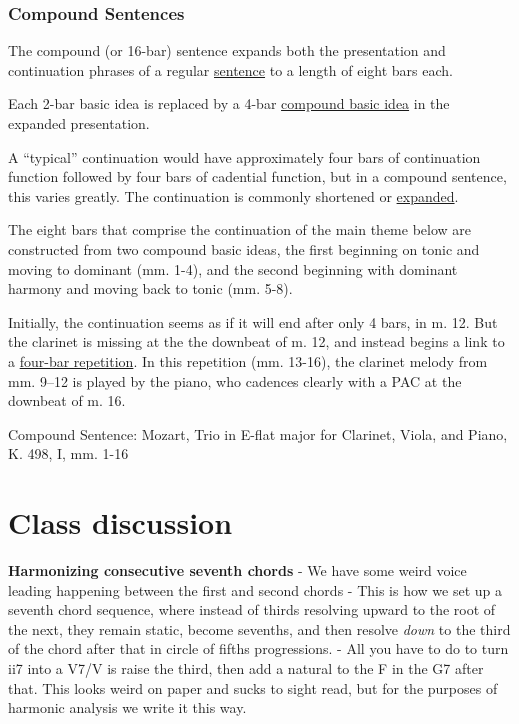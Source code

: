\documentclass{book}
\begin{document}
\hypertarget{compound-sentences}{%
\subsection{Compound Sentences}\label{compound-sentences}}

The compound (or 16-bar) sentence expands both the presentation and
continuation phrases of a regular \href{sentence.html}{sentence} to a length
of eight bars each.

Each 2-bar basic idea is replaced by a 4-bar
\href{hybridThemes.html\#the-compound-basic-idea}{compound basic idea} in the
expanded presentation.

A ``typical'' continuation would have approximately four bars of continuation
function followed by four bars of cadential function, but in a compound
sentence, this varies greatly. The continuation is commonly shortened or
\href{internalExpansions.html}{expanded}.

The eight bars that comprise the continuation of the main theme below are
constructed from two compound basic ideas, the first beginning on tonic and
moving to dominant (mm. 1-4), and the second beginning with dominant harmony
and moving back to tonic (mm. 5-8).

Initially, the continuation seems as if it will end after only 4 bars, in m.
12. But the clarinet is missing at the the downbeat of m. 12, and instead
begins a link to a \href{internalExpansions.html\#phrase-expansion}{four-bar
repetition}. In this repetition (mm. 13-16), the clarinet melody from mm.
9--12 is played by the piano, who cadences clearly with a PAC at the downbeat
of m. 16.

Compound Sentence: Mozart, Trio in E-flat major for Clarinet, Viola, and
Piano, K. 498, I, mm. 1-16

\hypertarget{class-discussion-54}{%
\chapter{Class discussion}\label{class-discussion-54}}

\textbf{Harmonizing consecutive seventh chords} - We have some weird voice
leading happening between the first and second chords - This is how we set up
a seventh chord sequence, where instead of thirds resolving upward to the root
of the next, they remain static, become sevenths, and then resolve \emph{down}
to the third of the chord after that in circle of fifths progressions. - All
you have to do to turn ii7 into a V7/V is raise the third, then add a natural
to the F in the G7 after that. This looks weird on paper and sucks to sight
read, but for the purposes of harmonic analysis we write it this way.
\end{document}
